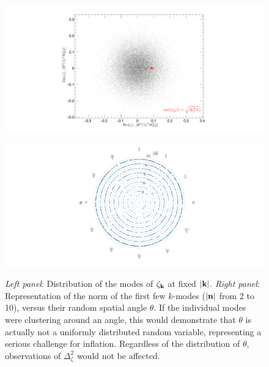 \documentclass[psfig,12pt]{article}
\begin{document}
{\begin{figure}[t]
\vspace{-1cm}
\begin{center}
\centering
\begin{minipage}[t]{0.48\linewidth}
\centering\includegraphics[trim = 80 -32 0 50 mm, width=.8\linewidth]{figures/onemodeThetadist.pdf}\\
\end{minipage}\hfill
\begin{minipage}[t]{0.48\linewidth}
\centering\includegraphics[trim = 0 0 0 0 mm, clip, width=.8\linewidth]{figures/first10modesThetadist.pdf}\\
\end{minipage}
\caption{\label{f:variations}
\small{{\it Left panel}: Distribution of the modes of $\zeta_{{\bf k}}$
at fixed $|{\bf k}|$.} \small{{\it Right panel}: Representation of  the
norm of the first few $k$-modes ($|{\bf n}|$ from 2 to 10), versus their
random spatial angle $\theta$. If the individual modes were clustering
around an angle, this would demonstrate that $\theta$ is actually not a
uniformly distributed random variable, representing a serious challenge
for inflation. Regardless of the distribution of $\theta$, observations
of $\Delta_\zeta^2$ would not be affected. }
\vspace{-1cm}
}
\end{center}
\end{figure}

}
\end{document}
